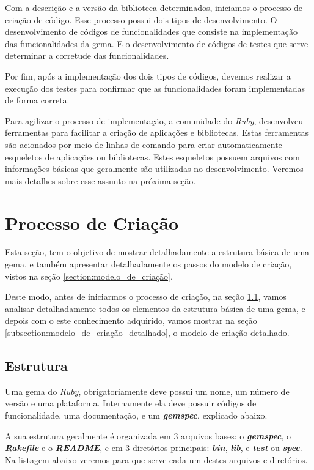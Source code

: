 Com a descrição e a versão da biblioteca determinados, iniciamos o processo de criação de código.
Esse processo possui dois tipos de desenvolvimento. O desenvolvimento de códigos de
funcionalidades que consiste na implementação das funcionalidades da gema. E o desenvolvimento
de códigos de testes que serve determinar a corretude das funcionalidades.

Por fim, após a implementação dos dois tipos de códigos, devemos realizar a execução dos testes
para confirmar que as funcionalidades foram implementadas de forma correta.

Para agilizar o processo de implementação, a comunidade do \emph{Ruby}, desenvolveu ferramentas para
facilitar a criação de aplicações e bibliotecas. Estas ferramentas são acionados por meio de
linhas de comando para criar automaticamente esqueletos de aplicações ou bibliotecas. Estes esqueletos
possuem arquivos com informações básicas que geralmente são utilizadas no desenvolvimento. Veremos
mais detalhes sobre esse assunto na próxima seção.


\section{Processo de Criação}
\label{section:processo_de_criação}


Esta seção, tem o objetivo de mostrar detalhadamente a estrutura básica de uma gema, e também apresentar
detalhadamente os passos do modelo de criação, vistos na seção \ref{section:modelo_de_criação}.

Deste modo, antes de iniciarmos o processo de criação, na seção \ref{subsection:estrutura}, vamos analisar
detalhadamente todos os elementos da estrutura básica de uma gema, e depois com o este conhecimento
adquirido, vamos mostrar na seção \ref{subsection:modelo_de_criação_detalhado}, o modelo de criação detalhado.


\subsection{Estrutura}
\label{subsection:estrutura}


Uma gema do \emph{Ruby}, obrigatoriamente deve possui um nome, um número de versão e uma plataforma.
Internamente ela deve possuir códigos de funcionalidade, uma documentação, e um \emph{\textbf{gemspec}},
explicado abaixo.

A sua estrutura geralmente é organizada em 3 arquivos bases: o \emph{\textbf{gemspec}}, o
\emph{\textbf{Rakefile}} e o \emph{\textbf{README}}, e em 3 diretórios principais: \emph{\textbf{bin}},
\emph{\textbf{lib}}, e \emph{\textbf{test}} ou \emph{\textbf{spec}}. Na listagem abaixo veremos para que
serve cada um destes arquivos e diretórios.

